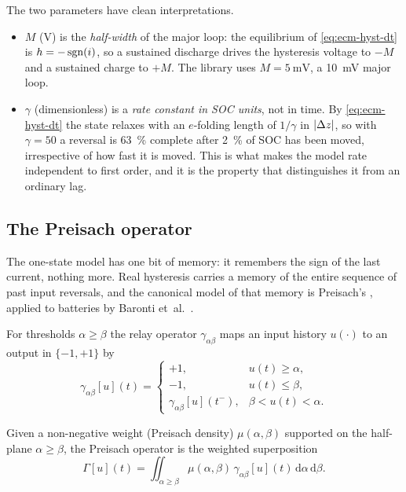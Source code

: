 The two parameters have clean interpretations.
\begin{itemize}[nosep,leftmargin=*]
\item $M$ (\si{\volt}) is the \emph{half-width} of the major loop: the equilibrium of
  \eqref{eq:ecm-hyst-dt} is $h = -\operatorname{sgn}(i)$, so a sustained discharge drives the hysteresis
  voltage to $-M$ and a sustained charge to $+M$. The library uses
  $M = \SI{5}{\milli\volt}$, a \SI{10}{\milli\volt} major loop.
\item $\gamma$ (dimensionless) is a \emph{rate constant in SOC units}, not in time. By
  \eqref{eq:ecm-hyst-dt} the state relaxes with an $e$-folding length of $1/\gamma$ in
  $|\Delta z|$, so with $\gamma=50$ a reversal is \SI{63}{\percent} complete after
  \SI{2}{\percent} of SOC has been moved, irrespective of how fast it is moved. This is what
  makes the model rate independent to first order, and it is the property that distinguishes it
  from an ordinary lag.
\end{itemize}

\subsection{The Preisach operator}
\label{sec:ecm-preisach}
The one-state model has one bit of memory: it remembers the sign of the last current, nothing
more. Real hysteresis carries a memory of the entire sequence of past input reversals, and the
canonical model of that memory is Preisach's \cite{preisach1935,mayergoyz1991hysteresis}, applied
to batteries by Baronti et~al.~\cite{baronti2014hysteresis}.

\begin{definition}\label{def:ecm-relay}
For thresholds $\alpha \ge \beta$ the relay operator $\gamma_{\alpha\beta}$ maps an input history
$u(\cdot)$ to an output in $\{-1,+1\}$ by
\begin{equation}
\gamma_{\alpha\beta}[u](t) =
\begin{cases}
+1, & u(t) \ge \alpha, \\
-1, & u(t) \le \beta, \\
\gamma_{\alpha\beta}[u](t^-), & \beta < u(t) < \alpha .
\end{cases}
\label{eq:ecm-relay}
\end{equation}
\end{definition}

\begin{definition}\label{def:ecm-preisach}
Given a non-negative weight (Preisach density) $\mu(\alpha,\beta)$ supported on the half-plane
$\alpha\ge\beta$, the Preisach operator is the weighted superposition
\begin{equation}
\Gamma[u](t) = \iint_{\alpha\ge\beta} \mu(\alpha,\beta)\,\gamma_{\alpha\beta}[u](t)\,
 \mathrm{d}\alpha\,\mathrm{d}\beta .
\label{eq:ecm-preisach}
\end{equation}
\end{definition}

